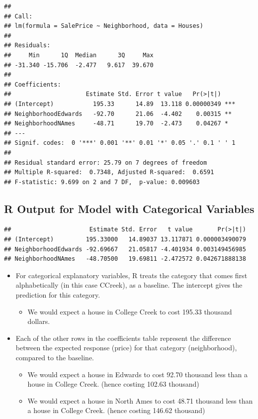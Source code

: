 \documentclass[]{book}
\providecommand{\tightlist}{%
  \setlength{\itemsep}{0pt}\setlength{\parskip}{0pt}}
\begin{document}
\begin{verbatim}
## 
## Call:
## lm(formula = SalePrice ~ Neighborhood, data = Houses)
## 
## Residuals:
##     Min      1Q  Median      3Q     Max 
## -31.340 -15.706  -2.477   9.617  39.670 
## 
## Coefficients:
##                     Estimate Std. Error t value   Pr(>|t|)    
## (Intercept)           195.33      14.89  13.118 0.00000349 ***
## NeighborhoodEdwards   -92.70      21.06  -4.402    0.00315 ** 
## NeighborhoodNAmes     -48.71      19.70  -2.473    0.04267 *  
## ---
## Signif. codes:  0 '***' 0.001 '**' 0.01 '*' 0.05 '.' 0.1 ' ' 1
## 
## Residual standard error: 25.79 on 7 degrees of freedom
## Multiple R-squared:  0.7348, Adjusted R-squared:  0.6591 
## F-statistic: 9.699 on 2 and 7 DF,  p-value: 0.009603
\end{verbatim}

\subsection{R Output for Model with Categorical
Variables}\label{r-output-for-model-with-categorical-variables}

\begin{verbatim}
##                      Estimate Std. Error   t value       Pr(>|t|)
## (Intercept)         195.33000   14.89037 13.117871 0.000003490079
## NeighborhoodEdwards -92.69667   21.05817 -4.401934 0.003149456985
## NeighborhoodNAmes   -48.70500   19.69811 -2.472572 0.042671888138
\end{verbatim}

\begin{itemize}
\tightlist
\item
  For categorical explanatory variables, R treats the category that
  comes first alphabetically (in this case CCreek), as a baseline. The
  intercept gives the prediction for this category.

  \begin{itemize}
  \tightlist
  \item
    We would expect a house in College Creek to cost 195.33 thousand
    dollars.
  \end{itemize}
\item
  Each of the other rows in the coefficients table represent the
  difference between the expected response (price) for that category
  (neighborhood), compared to the baseline.

  \begin{itemize}
  \tightlist
  \item
    We would expect a house in Edwards to cost 92.70 thousand less than
    a house in College Creek. (hence costing 102.63 thousand)\\
  \item
    We would expect a house in North Ames to cost 48.71 thousand less
    than a house in College Creek. (hence costing 146.62 thousand)
  \end{itemize}
\end{itemize}
\end{document}

